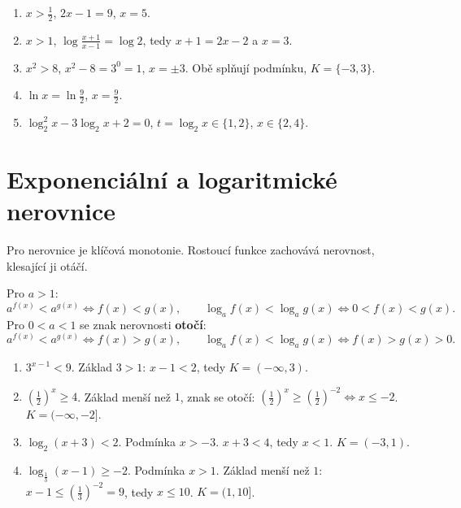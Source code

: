 \begin{solution}
  \begin{enumerate}[label=(\alph*)]
    \item $x > \frac{1}{2}$, $2x - 1 = 9$, $x = 5$.
    \item $x > 1$, $\log\frac{x + 1}{x - 1} = \log 2$, tedy $x + 1 = 2x - 2$ a $x = 3$.
    \item $x^2 > 8$, $x^2 - 8 = 3^0 = 1$, $x = \pm 3$. Obě splňují podmínku, $K = \{-3, 3\}$.
    \item $\ln x = \ln\frac{9}{2}$, $x = \frac{9}{2}$.
    \item $\log_2^2 x - 3\log_2 x + 2 = 0$, $t = \log_2 x\in\{1, 2\}$, $x\in\{2, 4\}$.
  \end{enumerate}
\end{solution}

\section{Exponenciální a logaritmické nerovnice}\label{sec:exp-log-nerovnice}

Pro nerovnice je klíčová monotonie. Rostoucí funkce zachovává nerovnost, klesající ji otáčí.

\begin{definitionbox}
  Pro $a > 1$:
  \begin{equation*}
    a^{f(x)} < a^{g(x)}\Leftrightarrow f(x) < g(x),\qquad \log_a f(x) < \log_a g(x)\Leftrightarrow 0 < f(x) < g(x).
  \end{equation*}
  Pro $0 < a < 1$ se znak nerovnosti \textbf{otočí}:
  \begin{equation*}
    a^{f(x)} < a^{g(x)}\Leftrightarrow f(x) > g(x),\qquad \log_a f(x) < \log_a g(x)\Leftrightarrow f(x) > g(x) > 0.
  \end{equation*}
\end{definitionbox}

\begin{example}
  \begin{enumerate}[label=(\alph*)]
    \item $3^{x - 1} < 9$. Základ $3 > 1$: $x - 1 < 2$, tedy $K = (-\infty, 3)$.
    \item ${\left(\frac{1}{2}\right)}^x\geq 4$. Základ menší než $1$, znak se otočí: ${\left(\frac{1}{2}\right)}^x\geq{\left(\frac{1}{2}\right)}^{-2}\Leftrightarrow x\leq -2$. $K = (-\infty, -2]$.
    \item $\log_2(x + 3) < 2$. Podmínka $x > -3$. $x + 3 < 4$, tedy $x < 1$. $K = (-3, 1)$.
    \item $\log_{\frac{1}{3}}(x - 1)\geq -2$. Podmínka $x > 1$. Základ menší než $1$: $x - 1\leq{\left(\frac{1}{3}\right)}^{-2} = 9$, tedy $x\leq 10$. $K = (1, 10]$.
  \end{enumerate}
\end{example}

